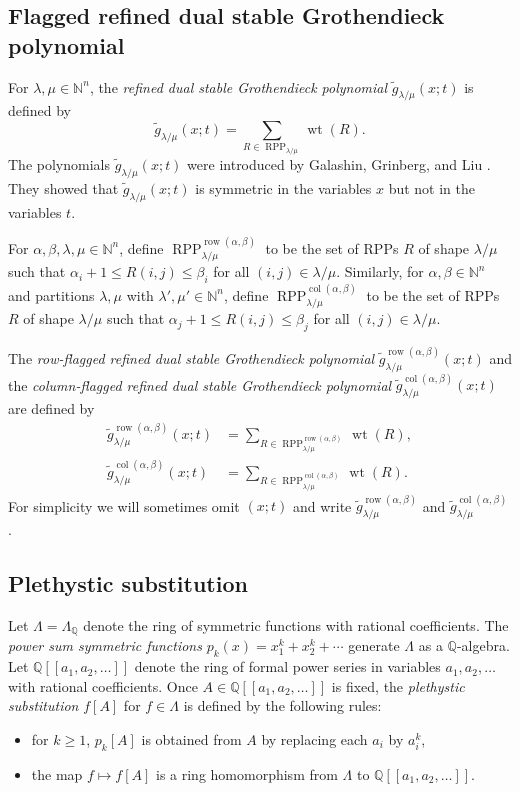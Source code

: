 \documentclass[12pt]{amsart}
\numberwithin{equation}{section}
\theoremstyle{definition}
\newcommand\wg{\widetilde{g}}
\newcommand\col{\operatorname{col}}
\newcommand\row{\operatorname{row}}
\newcommand\NN{\mathbb{N}}
\newcommand\RPP{\operatorname{RPP}}
\newcommand\lm{{\lambda/\mu}}
\newcommand\wt{\operatorname{wt}}
\begin{document}
\subsection{Flagged refined dual stable Grothendieck polynomial}


For $\lambda,\mu\in\NN^n$, the \emph{refined dual stable Grothendieck
  polynomial} $\wg_{\lambda/\mu}(x;t)$ is defined by
\[
  \wg_{\lambda/\mu}(x;t) =
\sum_{R\in \RPP_{\lambda/\mu}} \wt(R).
\]
The polynomials $\wg_\lm(x;t)$ were introduced by Galashin, Grinberg, and Liu
\cite{GGL2016}. They showed that $\wg_\lm(x;t)$ is symmetric in the variables
$x$ but not in the variables $t$.



For $\alpha,\beta,\lambda,\mu\in\NN^n$, define
$\RPP_{\lambda/\mu}^{\row(\alpha,\beta)}$ to be the set of RPPs $R$ of shape
$\lm$ such that $\alpha_i+1\le R(i,j)\le \beta_i$ for all $(i,j)\in\lm$.
Similarly, for $\alpha,\beta\in\NN^n$ and partitions $\lambda,\mu$ with
$\lambda',\mu'\in\NN^n$, define $\RPP_{\lambda/\mu}^{\col(\alpha,\beta)}$ to be
the set of RPPs $R$ of shape $\lm$ such that $\alpha_j+1\le R(i,j)\le \beta_j$
for all $(i,j)\in\lm$.

The \emph{row-flagged refined dual stable Grothendieck polynomial}
$\wg_{\lambda/\mu}^{\row(\alpha,\beta)}(x;t)$ and the \emph{column-flagged refined
  dual stable Grothendieck polynomial}
$\wg_{\lambda/\mu}^{\col(\alpha,\beta)}(x;t)$ are defined by
\begin{align*}
  \wg_{\lambda/\mu}^{\row(\alpha,\beta)}(x;t) &=
\sum_{R\in \RPP_{\lambda/\mu}^{\row(\alpha,\beta)}} \wt(R),\\
  \wg_{\lambda/\mu}^{\col(\alpha,\beta)}(x;t) &=
\sum_{R\in \RPP_{\lambda/\mu}^{\col(\alpha,\beta)}} \wt(R).
\end{align*}
For simplicity we will sometimes omit $(x;t)$ and write
$\wg_{\lambda/\mu}^{\row(\alpha,\beta)}$ and
$\wg_{\lambda/\mu}^{\col(\alpha,\beta)}$.


\subsection{Plethystic substitution}
\label{sec:plethysm}


Let $\Lambda=\Lambda_{\mathbb{Q}}$ denote the ring of symmetric functions with
rational coefficients. The \emph{power sum symmetric functions}
$p_k(x)=x_1^k+x_2^k+\cdots$ generate $\Lambda$ as a $\mathbb{Q}$-algebra. Let
$\mathbb{Q}[[a_1,a_2,\dots]]$ denote the ring of formal power series in
variables $a_1,a_2,\dots$ with rational coefficients. Once
$A\in\mathbb{Q}[[a_1,a_2,\dots]]$ is fixed, the \emph{plethystic substitution}
$f[A]$ for $f\in\Lambda$ is defined by the following rules:
\begin{itemize}
\item for $k\ge1$, $p_k[A]$ is obtained from $A$ by replacing each $a_i$ by
  $a_i^k$,
\item the map $f\mapsto f[A]$ is a ring homomorphism from $\Lambda$ to
  $\mathbb{Q}[[a_1,a_2,\dots]]$.
\end{itemize}
\end{document}
